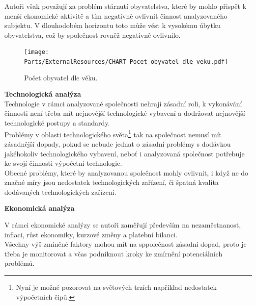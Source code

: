 Autoři však považují za problém stárnutí obyvatelstva, které by mohlo přispět k menší ekonomické aktivitě a tím negativně ovlivnit činnost analyzovaného subjektu. V dlouhodobém horizontu toto může vést k vysokému úbytku obyvatelstva, což by společnost rovněž negativně ovlivnilo.\\

\newpage

\begin{figure}[!hbtp]
	\centering
	\texttt{[image: Parts/ExternalResources/CHART\_Pocet\_obyvatel\_dle\_veku.pdf]}
	\caption[Počet obyvatel dle věku]{Počet obyvatel dle věku.}
	\label{fig:Pocet obyvatel dle veku}
\end{figure}




\noindent\textbf{Technologická analýza}\\

Technologie v rámci analyzované společnosti nehrají zásadní roli, k vykonávání činnosti není třeba mít nejnovější technologické vybavení a dodržovat nejnovější technologické postupy a standardy.\\

Problémy v oblasti technologického světa\footnote{Nyní je možné pozorovat na světových trzích například nedostatek výpočetních čipů.} tak na společnost nemusí mít zásadnější dopady, pokud se nebude jednat o zásadní problémy s dodávkou jakéhokoliv technologického vybavení, neboť i analyzovaná společnost potřebuje ke svojí činnosti výpočetní technologie.\\

Obecné problémy, které by analyzovanou společnost mohly ovlivnit, i když ne do značné míry jsou nedostatek technologických zařízení, či špatná kvalita dodávaných technologických zařízení.\\

\newpage

\noindent\textbf{Ekonomická analýza}\\

\vspace*{-2mm}

V rámci ekonomické analýzy se autoři zaměřují především na nezaměstnanost, inflaci, růst ekonomiky, kurzové změny a platební bilanci.\\

Všechny výš zmíněné faktory mohou mít na sppolečnost zásadní dopad, proto je třeba je monitorovat a včas podniknout kroky ke zmírnění potenciálních problémů.\\

